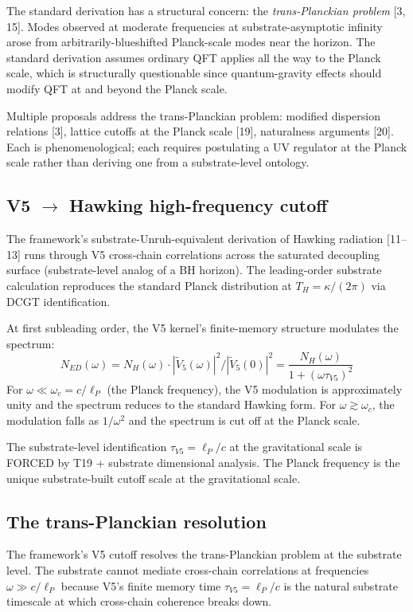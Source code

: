 \documentclass[11pt,a4paper]{article}
\begin{document}
The standard derivation has a structural concern: the \emph{trans-Planckian problem} [3, 15]. Modes observed at moderate frequencies at substrate-asymptotic infinity arose from arbitrarily-blueshifted Planck-scale modes near the horizon. The standard derivation assumes ordinary QFT applies all the way to the Planck scale, which is structurally questionable since quantum-gravity effects should modify QFT at and beyond the Planck scale.

Multiple proposals address the trans-Planckian problem: modified dispersion relations [3], lattice cutoffs at the Planck scale [19], naturalness arguments [20]. Each is phenomenological; each requires postulating a UV regulator at the Planck scale rather than deriving one from a substrate-level ontology.

\subsection{V5 $\to$ Hawking high-frequency cutoff}

The framework's substrate-Unruh-equivalent derivation of Hawking radiation [11--13] runs through V5 cross-chain correlations across the saturated decoupling surface (substrate-level analog of a BH horizon). The leading-order substrate calculation reproduces the standard Planck distribution at $T_H = \kappa/(2\pi)$ via DCGT identification.

At first subleading order, the V5 kernel's finite-memory structure modulates the spectrum:
\[
N_{ED}(\omega) = N_H(\omega) \cdot |\tilde V_5(\omega)|^{2} / |\tilde V_5(0)|^{2} = \frac{N_H(\omega)}{1 + (\omega\tau_{V5})^{2}}
\]
For $\omega \ll \omega_c = c/\ell_P$ (the Planck frequency), the V5 modulation is approximately unity and the spectrum reduces to the standard Hawking form. For $\omega \gtrsim \omega_c$, the modulation falls as $1/\omega^{2}$ and the spectrum is cut off at the Planck scale.

The substrate-level identification $\tau_{V5} = \ell_P/c$ at the gravitational scale is FORCED by T19 + substrate dimensional analysis. The Planck frequency is the unique substrate-built cutoff scale at the gravitational scale.

\subsection{The trans-Planckian resolution}

The framework's V5 cutoff resolves the trans-Planckian problem at the substrate level. The substrate cannot mediate cross-chain correlations at frequencies $\omega \gg c/\ell_P$ because V5's finite memory time $\tau_{V5} = \ell_P/c$ is the natural substrate timescale at which cross-chain coherence breaks down.
\end{document}
